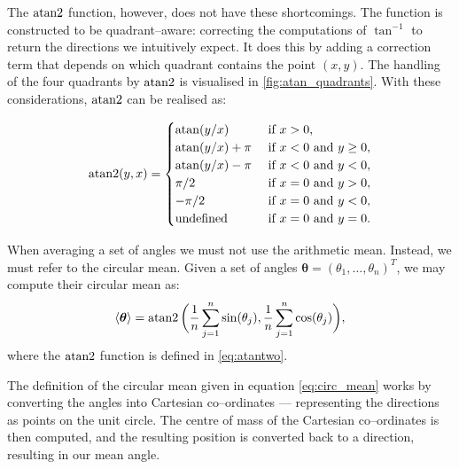 The $\operatorname{atan2}$ function, however, does not have these shortcomings. The function is constructed to be 
quadrant--aware: correcting the computations of $\tan^{-1}$ to return the directions we intuitively 
expect. It does this by adding a correction term that depends on which quadrant contains the point 
$(x, y)$. The handling of the four quadrants by $\operatorname{atan2}$ is visualised in 
\cref{fig:atan_quadrants}. With these considerations, $\operatorname{atan2}$ can be realised as:

\begin{equation}
\label{eq:atantwo}
	\atantwo(y, x) = 
	\begin{cases}
		\atan(y/x) & \text{ if } x > 0, \\
		\atan(y/x) + \pi & \text{ if } x < 0 \text{ and } y \geq 0, \\
		\atan(y/x) - \pi & \text{ if } x < 0 \text{ and } y < 0, \\
		\pi/2  & \text{ if } x = 0 \text{ and } y > 0, \\
		- \pi/2 & \text{ if } x = 0 \text{ and } y < 0, \\
		\text{undefined} & \text{ if } x = 0 \text{ and } y = 0. \\
	\end{cases}
\end{equation}

When averaging a set of angles we must not use the arithmetic mean. Instead, we must refer to the 
circular mean. Given a set of angles $\bm{\theta} = (\theta_1, \ldots, \theta_n)^T$, we may compute 
their circular mean as:
\begin{equation}
	\label{eq:circ_mean}
	\langle \bm{\theta} \rangle = \operatorname{atan2}\bigg(\frac{1}{n} \sum_{j=1}^n \sin(\theta_j), \frac{1}{n} 
\sum_{j=1}^n \cos(\theta_j)\bigg),
\end{equation}
where the $\operatorname{atan2}$ function is defined in \cref{eq:atantwo}.

The definition of the circular mean given in equation \cref{eq:circ_mean} works by converting the 
angles into Cartesian co--ordinates --- representing the directions as points on the unit circle. The 
centre of mass of the Cartesian co--ordinates is then computed, and the resulting position is 
converted back to a direction, resulting in our mean angle.
